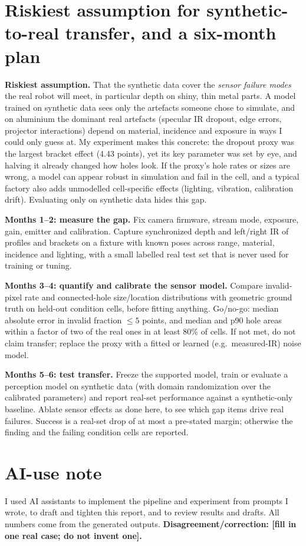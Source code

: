 \documentclass[10pt]{article}
\begin{document}
\clearpage
\section*{Riskiest assumption for synthetic-to-real transfer, and a six-month plan}
\textbf{Riskiest assumption.} That the synthetic data cover the \emph{sensor failure modes} the real robot will meet, in particular depth on shiny, thin metal parts. A model trained on synthetic data sees only the artefacts someone chose to simulate, and on aluminium the dominant real artefacts (specular IR dropout, edge errors, projector interactions) depend on material, incidence and exposure in ways I could only guess at. My experiment makes this concrete: the dropout proxy was the largest bracket effect (4.43 points), yet its key parameter was set by eye, and halving it already changed how holes look. If the proxy's hole rates or sizes are wrong, a model can appear robust in simulation and fail in the cell, and a typical factory also adds unmodelled cell-specific effects (lighting, vibration, calibration drift). Evaluating only on synthetic data hides this gap.

\textbf{Months 1--2: measure the gap.} Fix camera firmware, stream mode, exposure, gain, emitter and calibration. Capture synchronized depth and left/right IR of profiles and brackets on a fixture with known poses across range, material, incidence and lighting, with a small labelled real test set that is never used for training or tuning.

\textbf{Months 3--4: quantify and calibrate the sensor model.} Compare invalid-pixel rate and connected-hole size/location distributions with geometric ground truth on held-out condition cells, before fitting anything. Go/no-go: median absolute error in invalid fraction $\le5$ points, and median and p90 hole areas within a factor of two of the real ones in at least 80\% of cells. If not met, do not claim transfer; replace the proxy with a fitted or learned (e.g.\ measured-IR) noise model.

\textbf{Months 5--6: test transfer.} Freeze the supported model, train or evaluate a perception model on synthetic data (with domain randomization over the calibrated parameters) and report real-set performance against a synthetic-only baseline. Ablate sensor effects as done here, to see which gap items drive real failures. Success is a real-set drop of at most a pre-stated margin; otherwise the finding and the failing condition cells are reported.

\section*{AI-use note}
I used AI assistants to implement the pipeline and experiment from prompts I wrote, to draft and tighten this report, and to review results and drafts. All numbers come from the generated outputs. \textbf{Disagreement/correction: [fill in one real case; do not invent one].}
\end{document}
